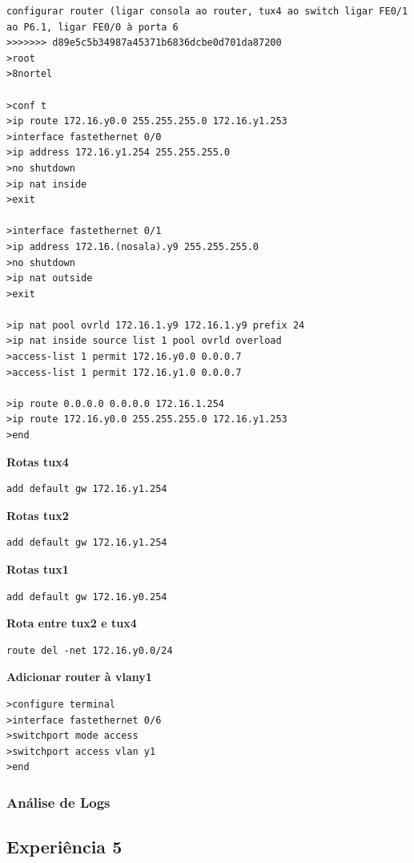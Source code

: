 \documentclass[a4paper,11pt]{article}
\begin{document}
\begin{lstlisting}
configurar router (ligar consola ao router, tux4 ao switch ligar FE0/1 ao P6.1, ligar FE0/0 à porta 6
>>>>>>> d89e5c5b34987a45371b6836dcbe0d701da87200
>root
>8nortel

>conf t
>ip route 172.16.y0.0 255.255.255.0 172.16.y1.253 
>interface fastethernet 0/0 
>ip address 172.16.y1.254 255.255.255.0 
>no shutdown 
>ip nat inside 
>exit 

>interface fastethernet 0/1 
>ip address 172.16.(nosala).y9 255.255.255.0 
>no shutdown 
>ip nat outside 
>exit 

>ip nat pool ovrld 172.16.1.y9 172.16.1.y9 prefix 24
>ip nat inside source list 1 pool ovrld overload 
>access-list 1 permit 172.16.y0.0 0.0.0.7 
>access-list 1 permit 172.16.y1.0 0.0.0.7 

>ip route 0.0.0.0 0.0.0.0 172.16.1.254 
>ip route 172.16.y0.0 255.255.255.0 172.16.y1.253 
>end
\end{lstlisting}

\textbf{Rotas tux4}
\begin{lstlisting}
add default gw 172.16.y1.254 
\end{lstlisting}

\textbf{Rotas tux2} 
\begin{lstlisting}
add default gw 172.16.y1.254
\end{lstlisting}

\textbf{Rotas tux1}
\begin{lstlisting}
add default gw 172.16.y0.254
\end{lstlisting}

\textbf{Rota entre tux2 e tux4}
\begin{lstlisting}
route del -net 172.16.y0.0/24
\end{lstlisting}

\textbf{Adicionar router à vlany1}

\begin{lstlisting}
>configure terminal
>interface fastethernet 0/6
>switchport mode access
>switchport access vlan y1
>end
\end{lstlisting}

\subsubsection{Análise de Logs}

\subsection{Experiência 5}
\end{document}
